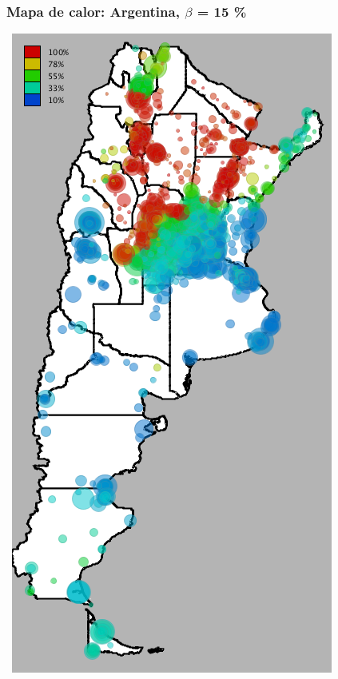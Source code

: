 \documentclass[xcolor=x11names]{beamer}
\begin{document}
\begin{frame}
	\frametitle{Mapa de calor: Argentina, $\beta$ = 15 \%}
	\center\
	\includegraphics[height=.9\textheight,width = .9\columnwidth, keepaspectratio]
	{slides/201112_hi_res_argentina_usuarios_proporcion_circulos_beta15.png}
\end{frame}
\end{document}
